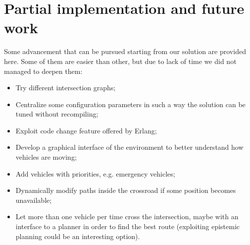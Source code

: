 \documentclass{memoir}
\begin{document}
\section{Partial implementation and future work}
Some advancement that can be pursued starting from our solution are provided here. Some of them are easier than other, but due to lack of time we did not managed to deepen them:
\begin{itemize}
	\item Try different intersection graphs;
	\item Centralize some configuration parameters in such a way the solution can be tuned without recompiling;
	\item Exploit code change feature offered by Erlang;
	\item Develop a graphical interface of the environment to better understand how vehicles are moving;
	\item Add vehicles with priorities, e.g. emergency vehicles;
	\item Dynamically modify paths inside the crossroad if some position becomes unavailable;
	\item Let more than one vehicle per time cross the intersection, maybe with an interface to a planner in order to find the best route (exploiting epistemic planning could be an interesting option).
\end{itemize}
\end{document}
